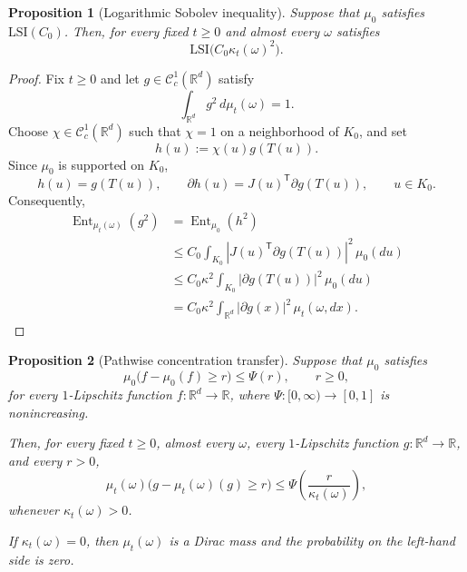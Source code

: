 \documentclass{tsp-short}
\newtheorem{proposition}{Proposition}[section]
\theoremstyle{remark}
\theoremstyle{definition}
\newcommand{\R}{\mathbb{R}} %
\newcommand{\cC}{\mathcal{C}} %
\DeclareMathOperator{\Ent}{Ent} %
\begin{document}
\begin{proposition}[Logarithmic Sobolev inequality]\label{prop:pathwise-lsi}
	Suppose that \(\mu_0\) satisfies \(\mathrm{LSI}(C_0)\). Then, for every fixed \(t\ge0\) and almost every \(\omega\) satisfies
	\begin{equation*}
		\mathrm{LSI}\bigl(C_0\kappa_t(\omega)^2\bigr).
	\end{equation*}
\end{proposition}

\begin{proof}
	Fix \(t\ge0\) and let \(g\in\cC_c^1(\R^d)\) satisfy
	\begin{equation*}
		\int_{\R^d}g^2\,d\mu_t(\omega)=1.
	\end{equation*}
	Choose \(\chi\in\cC_c^1(\R^d)\) such that \(\chi=1\) on a neighborhood of \(K_0\), and set
	\begin{equation*}
		h(u):=\chi(u)g(T(u)).
	\end{equation*}
	Since \(\mu_0\) is supported on \(K_0\),
	\begin{equation*}
		h(u)=g(T(u)), \qquad \partial h(u)=J(u)^{\mathsf T}\partial g(T(u)), \qquad u\in K_0.
	\end{equation*}
	Consequently,
	\begin{align*}
		\Ent_{\mu_t(\omega)}(g^2) & = \Ent_{\mu_0}(h^2)                                                         \\
		                          & \le C_0\int_{K_0}\left|J(u)^{\mathsf T}\partial g(T(u))\right|^2\,\mu_0(du) \\
		                          & \le C_0\kappa^2\int_{K_0}|\partial g(T(u))|^2\,\mu_0(du)                    \\
		                          & = C_0\kappa^2\int_{\R^d}|\partial g(x)|^2\,\mu_t(\omega,dx).
	\end{align*}
\end{proof}

\begin{proposition}[Pathwise concentration transfer]\label{prop:concentration-transfer}
	Suppose that \(\mu_0\) satisfies
	\begin{equation*}
		\mu_0\bigl(f-\mu_0(f)\ge r\bigr) \le \Psi(r), \qquad r\ge0,
	\end{equation*}
	for every \(1\)-Lipschitz function \(f:\R^d\to\R\), where \(\Psi:[0,\infty)\to[0,1]\) is nonincreasing.

	Then, for every fixed \(t\ge0\), almost every \(\omega\), every \(1\)-Lipschitz function \(g:\R^d\to\R\), and every \(r>0\),
	\begin{equation*}
		\mu_t(\omega)\bigl(g-\mu_t(\omega)(g)\ge r\bigr) \le \Psi\left(\frac{r}{\kappa_t(\omega)}\right),
	\end{equation*}
	whenever \(\kappa_t(\omega)>0\).

	If \(\kappa_t(\omega)=0\), then \(\mu_t(\omega)\) is a Dirac mass and the probability on the left-hand side is zero.
\end{proposition}
\end{document}
